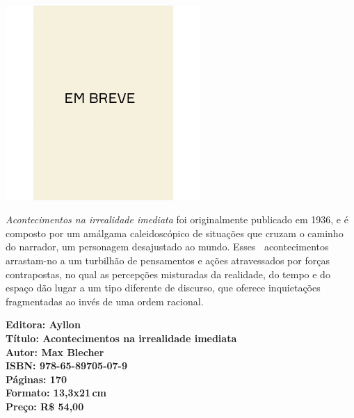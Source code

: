 \begin{center}
\hspace*{.5cm}\includegraphics[width=74mm]{./CAPAS/breve.jpeg}
\end{center}
\hspace*{-7cm}\hrulefill\hspace*{-7cm}
\medskip

\noindent{}\textit{Acontecimentos na irrealidade imediata} foi originalmente publicado em 1936, e é composto por um amálgama caleidoscópico de situações que cruzam o caminho do narrador, um personagem desajustado ao mundo. Esses􏰃􏰀 acontecimentos arrastam-no a um turbilhão de pensamentos e ações atravessados por forças contrapostas, no qual as percepções misturadas da realidade, do tempo e do espaço dão lugar a um tipo diferente de discurso, que oferece inquietações fragmentadas ao invés de uma ordem racional.

\vfill
\noindent\begin{minipage}[c]{1\linewidth}
{\small\textbf{
\hspace*{-.1cm}Editora: Ayllon\\
Título: Acontecimentos na irrealidade imediata\\
Autor: Max Blecher\\ 
ISBN: 978-65-89705-07-9\\
Páginas: 170\\
Formato: 13,3x21\,cm\\
Preço: R\$ 54,00\\
}}
\end{minipage}
\pagebreak

